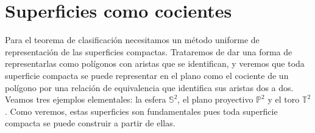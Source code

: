 \documentclass[10pt]{report}
\newcommand{\Esfera}{\mathbb{S}^2}
\newcommand{\Toro}{\mathbb{T}^2}
\newcommand{\Proyectivo}{\mathbb{P}^2}
\theoremstyle{definition}
\begin{document}
\section{Superficies como cocientes}

Para el teorema de clasificación necesitamos un método uniforme de representación de las superficies compactas. Trataremos de dar una forma de representarlas como polígonos con aristas que se identifican, y veremos que toda superficie compacta se puede representar en el plano como el cociente de un polígono por una relación de equivalencia que identifica sus aristas dos a dos.\\
Veamos tres ejemplos elementales: la esfera $\Esfera$, el plano proyectivo $\Proyectivo$ y el toro $\Toro$. Como veremos, estas superficies son fundamentales pues toda superficie compacta se puede construir a partir de ellas. 
\end{document}
